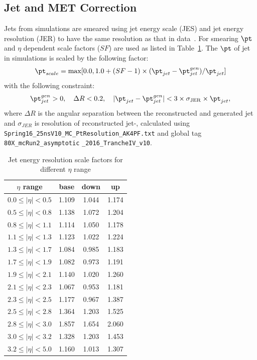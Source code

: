 \subsection{Jet and MET Correction}
\label{s:JEC}
Jets from simulations are smeared using jet energy scale (JES) and jet energy 
resolution (JER) to have the same resolution as that in data~\cite{Khachatryan:2016kdb}.
For smearing $\pt$ and $\eta$ dependent scale factors ($SF$) are used as listed 
in Table~\ref{tab:jer_sf}. The $\pt$ of jet in simulations is scaled by the 
following factor:
\begin{equation}
    {\pt}_{scale} = {\rm
    max}[0.0,1.0+(SF-1)\times({\pt}_{jet}-{\pt}_{jet}^{gen})/{\pt}_{jet}]
\end{equation}
with the following constraint:
\begin{equation}
    {\pt}_{jet}^{gen}> 0, \quad \Delta R<0.2, \quad |{\pt}_{jet}-{\pt}_{jet}^{gen} |<
    3\times\sigma_{\rm JER}\times{\pt}_{jet},
\end{equation}
where $\Delta R$ is the angular separation between the reconstructed and 
generated jet and $\sigma_{JER}$ is resolution of reconstructed jet-\pt, calculated using
\verb|Spring16_25nsV10_MC_PtResolution_AK4PF.txt| and global tag \verb|80X_mcRun2_asymptotic| \verb|_2016_TrancheIV_v10|. 
\begin{table}
    \caption{Jet energy resolution scale factors for different $\eta$ range}
 \label{tab:jer_sf}
 \begin{center}
 \begin{tabular}{cccc}
     \hline
     \hline
     $\eta$ range & base & down & up \\ 
     \hline
     \hline
     $0.0 \leq | \eta |< 0.5 $ & 1.109 & 1.044 & 1.174 \\
     $0.5 \leq | \eta |< 0.8 $ & 1.138 & 1.072 & 1.204 \\
     $0.8 \leq | \eta |< 1.1 $ & 1.114 & 1.050 & 1.178 \\
     $1.1 \leq | \eta |< 1.3 $ & 1.123 & 1.022 & 1.224 \\
     $1.3 \leq | \eta |< 1.7 $ & 1.084 & 0.985 & 1.183 \\
     $1.7 \leq | \eta |< 1.9 $ & 1.082 & 0.973 & 1.191 \\
     $1.9 \leq | \eta |< 2.1 $ & 1.140 & 1.020 & 1.260 \\
     $2.1 \leq | \eta |< 2.3 $ & 1.067 & 0.953 & 1.181 \\
     $2.3 \leq | \eta |< 2.5 $ & 1.177 & 0.967 & 1.387 \\
     $2.5 \leq | \eta |< 2.8 $ & 1.364 & 1.203 & 1.525 \\
     $2.8 \leq | \eta |< 3.0 $ & 1.857 & 1.654 & 2.060 \\
     $3.0 \leq | \eta |< 3.2 $ & 1.328 & 1.203 & 1.453 \\
     $3.2 \leq | \eta |< 5.0 $ & 1.160 & 1.013 & 1.307 \\ \hline
 \end{tabular}
 \end{center}
 \end{table}

